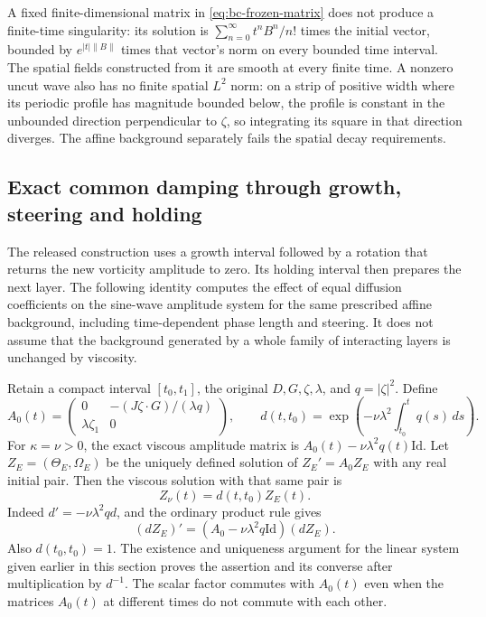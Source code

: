 A fixed finite-dimensional matrix in \eqref{eq:bc-frozen-matrix}
does not produce a finite-time singularity: its solution is
$\sum_{n=0}^{\infty}t^nB^n/n!$ times the initial vector, bounded by
$e^{|t|\|B\|}$ times that vector's norm on every bounded time interval.
The spatial fields constructed from it are smooth at every finite
time. A nonzero uncut wave also has no finite spatial $L^2$ norm:
on a strip of positive width where its periodic profile has
magnitude bounded below, the profile is constant in the unbounded
direction perpendicular to $\zeta$, so integrating its square in
that direction diverges. The affine background separately fails
the spatial decay requirements.

\subsection{Exact common damping through growth, steering and holding}

The released construction uses a growth interval followed by a rotation
that returns the new vorticity amplitude to zero. Its holding interval
then prepares the next layer. The following identity computes the effect
of equal diffusion coefficients on the sine-wave amplitude system for
the same prescribed affine background, including time-dependent phase
length and steering. It does not assume that the background generated
by a whole family of interacting layers is unchanged by viscosity.

Retain a compact interval $[t_0,t_1]$, the original $D,G,\zeta,\lambda$,
and $q=|\zeta|^2$. Define
\[
 A_0(t)=\begin{pmatrix}
 0&-(J\zeta\cdot G)/(\lambda q)\\
 \lambda\zeta_1&0
 \end{pmatrix},\qquad
 d(t,t_0)=\exp\left(-\nu\lambda^2\int_{t_0}^tq(s)\,ds\right).
\]
For $\kappa=\nu>0$, the exact viscous amplitude matrix is
$A_0(t)-\nu\lambda^2q(t)\mathrm{Id}$. Let $Z_E=(\Theta_E,\Omega_E)$
be the uniquely defined solution of $Z_E'=A_0Z_E$ with any real
initial pair. Then the viscous solution with that same pair is
\begin{equation}\label{eq:bc-common-damping}
 Z_\nu(t)=d(t,t_0)Z_E(t).
\end{equation}
Indeed $d'=-\nu\lambda^2qd$, and the ordinary product rule gives
\[
 (dZ_E)'=(A_0-\nu\lambda^2q\mathrm{Id})(dZ_E).
\]
Also $d(t_0,t_0)=1$. The existence and uniqueness argument for the
linear system given earlier in this section proves the assertion and
its converse after multiplication by $d^{-1}$. The scalar factor
commutes with $A_0(t)$ even when the matrices $A_0(t)$ at different
times do not commute with each other.

